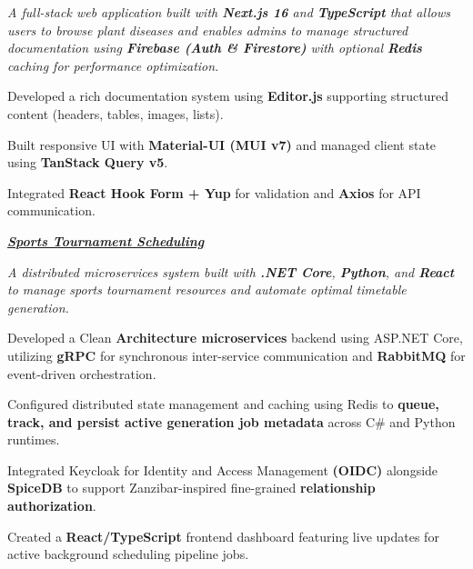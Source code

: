 \vspace{0.10 cm}
\begin{onecolentry}

\textit{A full-stack web application built with \textbf{Next.js 16} and 
\textbf{TypeScript} that allows users to browse plant diseases and enables 
admins to manage structured documentation using \textbf{Firebase (Auth \& Firestore)} 
with optional \textbf{Redis} caching for performance optimization.}

\vspace{0.05 cm}

\begin{highlights}
    
    \item Developed a rich documentation system using \textbf{Editor.js} supporting structured content (headers, tables, images, lists).
    \item Built responsive UI with \textbf{Material-UI (MUI v7)} and managed client state using \textbf{TanStack Query v5}.
    \item Integrated \textbf{React Hook Form + Yup} for validation and \textbf{Axios} for API communication.
\end{highlights}

\end{onecolentry}
\vspace{0.5 cm}

% 
\textit{\href{https://github.com/ahmniab/SportsTournamentScheduling}{\textcolor{linkColor}{\textbf{Sports Tournament Scheduling }}}}

\vspace{0.10 cm}
\begin{onecolentry}
    \textit{A distributed microservices system built with \textbf{.NET Core}, \textbf{Python}, and \textbf{React} to manage sports tournament resources and automate optimal timetable generation.}
    \begin{highlights}
        \item Developed a Clean \textbf{Architecture microservices} backend using ASP.NET Core, utilizing \textbf{gRPC} for synchronous inter-service communication and \textbf{RabbitMQ} for event-driven orchestration.
        \item Configured distributed state management and caching using Redis to \textbf{queue, track, and persist active generation job metadata} across C\# and Python runtimes.
        \item Integrated Keycloak for Identity and Access Management \textbf{(OIDC)} alongside \textbf{SpiceDB} to support Zanzibar-inspired fine-grained \textbf{relationship authorization}.
        \item Created a \textbf{React/TypeScript} frontend dashboard featuring live updates for active background scheduling pipeline jobs.
    \end{highlights}
\end{onecolentry}


